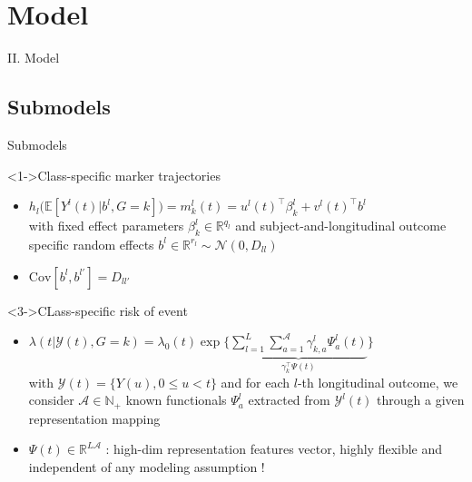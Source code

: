 \documentclass{beamer}
\newcommand{\E}{\mathbb E}
\newcommand{\N}{\mathbb N}
\newcommand{\R}{\mathbb R}
\newcommand{\cA}{\mathcal A}
\newcommand{\cY}{\mathcal Y}
\newcommand{\cN}{\mathcal N}
\begin{document}
\section{Model}

\begin{frame}[noframenumbering]
\Large \centering
\textcolor{blue_pres}{II.} Model
\end{frame}

\subsection{Submodels}

\begin{frame}{Submodels}

\small
\begin{block}<1->{Class-specific marker trajectories}
\begin{itemize}
  \footnotesize
  \item<1-> $h_l\big(\E[Y^l(t)|b^l, G=k]\big) = m_k^l(t) = u^l(t)^\top\beta_k^l + v^l(t)^\top b^l$\\
  with fixed effect parameters $\beta_k^l \in \R^{q_l}$ and subject-and-longitudinal outcome specific random effects $b^l \in \R^{r_l} \sim \cN(0, D_{ll})$
  \item<2-> $\text{Cov}[b^l,b^{l'}] = D_{ll'}$

\end{itemize}
\end{block}

\begin{block}<3->{CLass-specific risk of event}
\begin{itemize}
  \item<3-> $\lambda(t|\cY(t), G = k) = \lambda_0(t) \exp \Big\{\underbrace{\sum_{l=1}^L \sum_{a=1}^\cA \gamma_{k,a}^l \Psi_a^l(t)}_{\gamma_k^\top \Psi(t)} \Big\}$ \\
    \vspace{.1cm}
    with $\cY(t) = \{Y(u), 0 \leq u < t\}$ and for each $l$-th longitudinal outcome, we consider $\cA \in \N_+$ known functionals $\Psi_a^l$ extracted from $\cY^l(t)$ through a given representation mapping
  \item<4-> $\Psi(t) \in \R^{L\cA}$ : high-dim representation features vector, highly flexible and independent of any modeling assumption !
  
\end{itemize}
\end{block}

\end{frame}
\end{document}
